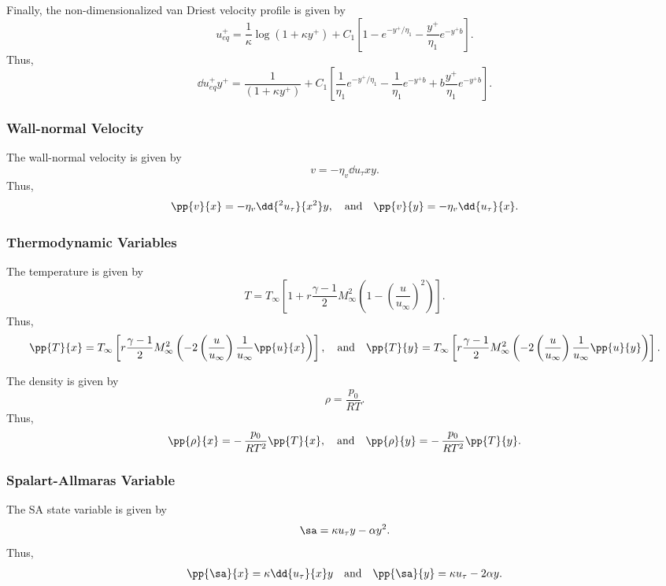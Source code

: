 Finally, the non-dimensionalized van Driest velocity profile is given
by
%
\begin{equation*}
u_{eq}^+ = \frac{1}{\kappa} \log \left( 1 + \kappa y^+ \right) + C_1 \left[ 1 - e^{-y^+/\eta_1} - \frac{y^+}{\eta_1} e^{-y^+ b} \right].
\end{equation*}
%
Thus,
%
\begin{equation*}
\dd{u_{eq}^+}{y^+} = \frac{1}{\left( 1 + \kappa y^+ \right)} + C_1 \left[ \frac{1}{\eta_1} e^{-y^+/\eta_1} - \frac{1}{\eta_1} e^{-y^+ b} + b \frac{y^+}{\eta_1} e^{-y^+ b} \right].
\end{equation*}
%

\subsubsection{Wall-normal Velocity}
The wall-normal velocity is given by
%
\begin{equation*}
v = -\eta_v \dd{u_{\tau}}{x} y.
\end{equation*}
%
Thus,
%
\begin{gather*}
\pp{v}{x} = - \eta_v \dd{^2 u_{\tau}}{x^2} y, \quad \text{and} \quad
\pp{v}{y} = - \eta_v \dd{u_{\tau}}{x}.
\end{gather*}
%

\subsubsection{Thermodynamic Variables}
The temperature is given by
%
\begin{equation*}
T = T_{\infty} \left[ 1 + r \frac{\gamma - 1}{2} M_{\infty}^2 \left( 1 - \left(\frac{u}{u_{\infty}}\right)^2 \right) \right].
\end{equation*}
%
Thus,
%
\begin{gather*}
\pp{T}{x} = T_{\infty} \left[  r \frac{\gamma - 1}{2} M_{\infty}^2 \left(  - 2 \left(\frac{u}{u_{\infty}}\right) \frac{1}{u_{\infty}} \pp{u}{x} \right) \right], \quad \text{and} \quad
\pp{T}{y} = T_{\infty} \left[  r \frac{\gamma - 1}{2} M_{\infty}^2 \left(  - 2 \left(\frac{u}{u_{\infty}}\right) \frac{1}{u_{\infty}} \pp{u}{y} \right) \right].
\end{gather*}
%

The density is given by
%
\begin{equation*}
\rho = \frac{p_0}{R T}.
\end{equation*}
%
Thus,
%
\begin{gather*}
\pp{\rho}{x} = - \, \frac{p_0}{R T^2} \pp{T}{x}, \quad \text{and} \quad
\pp{\rho}{y} = - \, \frac{p_0}{R T^2} \pp{T}{y}. 
\end{gather*}

\subsubsection{Spalart-Allmaras Variable}
The SA state variable is given by
%
\begin{equation*}
\sa = \kappa u_{\tau} y - \alpha y^2.
\end{equation*}
%
Thus,
%
\begin{gather*}
\pp{\sa}{x} = \kappa \dd{u_{\tau}}{x} y \quad \text{and} \quad
\pp{\sa}{y} = \kappa u_{\tau} - 2 \alpha y.
\end{gather*}
%
